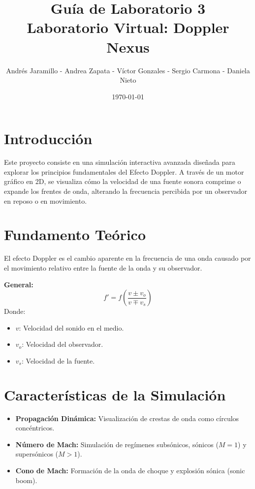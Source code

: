 \documentclass[12pt,a4paper]{article}
\title{\textbf{Guía de Laboratorio 3}\\ \Large Laboratorio Virtual: Doppler Nexus}
\author{Andrés Jaramillo - Andrea Zapata - Víctor Gonzales - Sergio Carmona - Daniela Nieto}
\date{\today}
\begin{document}
\maketitle

\section{Introducción}
Este proyecto consiste en una simulación interactiva avanzada diseñada para explorar los principios fundamentales del Efecto Doppler. A través de un motor gráfico en 2D, se visualiza cómo la velocidad de una fuente sonora comprime o expande los frentes de onda, alterando la frecuencia percibida por un observador en reposo o en movimiento.

\section{Fundamento Teórico}
El efecto Doppler es el cambio aparente en la frecuencia de una onda causado por el movimiento relativo entre la fuente de la onda y su observador.

\begin{tcolorbox}[colback=purple!5!white,colframe=purple!75!black,title=Ecuaciones del Efecto Doppler]
\textbf{General:} 
\[ f' = f \left( \frac{v \pm v_o}{v \mp v_s} \right) \]
Donde:
\begin{itemize}
    \item $v$: Velocidad del sonido en el medio.
    \item $v_o$: Velocidad del observador.
    \item $v_s$: Velocidad de la fuente.
\end{itemize}
\end{tcolorbox}

\section{Características de la Simulación}
\begin{itemize}
    \item \textbf{Propagación Dinámica:} Visualización de crestas de onda como círculos concéntricos.
    \item \textbf{Número de Mach:} Simulación de regímenes subsónicos, sónicos ($M=1$) y supersónicos ($M>1$).
    \item \textbf{Cono de Mach:} Formación de la onda de choque y explosión sónica (sonic boom).
\end{itemize}
\end{document}
